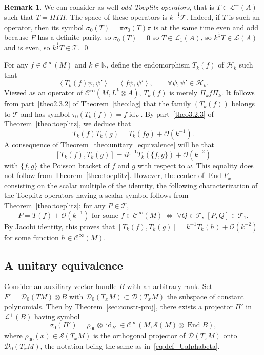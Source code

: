 \documentclass[10pt,a4paper]{article}
\theoremstyle{definition}
\newtheorem{rema}[theo]{Remark}
\numberwithin{equation}{section}
\newcommand{\N}{{\mathbb{N}}}
\newcommand{\si}{{\sigma}}
\newcommand{\om}{{\omega}}
\newcommand{\op}{\operatorname}
\newcommand{\Ci}{{\mathcal{C}}^{\infty}}
\newcommand{\bigo}{\mathcal{O}}
\newcommand{\D}{\mathcal{D}}
\newcommand{\symb}{\mathcal{S}}
\newcommand{\lag}{\mathcal{L}}
\newcommand{\Hilb}{\mathcal{H}}
\newcommand{\clT}{\mathcal{T}}
\newcommand{\Uu}{\rho}
\let\oldforall\forall
\renewcommand*{\forall}{\mathrel{\oldforall}}
\begin{document}
\begin{rema} \label{rem:odd_toeplitz}
We can consider as well {\em odd Toeplitz operators}, that is $T \in \lag^{-} (A)$ such that $T =
\Pi T \Pi$. The space of these operators is $k^{-\frac{1}{2}} \clT$. Indeed, if $T $ is such an operator, then its symbol $ \si_0 (T) = \pi \si_0 (T) \pi$ is at the same time even and odd because $F$ has a definite parity, so $\si_0(T) =0$ so $T
\in \lag_1 (A)$, so $k^{\frac{1}{2}} T \in \lag (A)$ and is even, so $k^{\frac{1}{2}} T \in \clT$. \qed
\end{rema}


For any $f \in \Ci(M)$ and $k \in \N$, define the endomorphism $T_k(f)$ of $\Hilb_k$ such that
\[
\left\langle T_k (f) \psi, \psi' \right\rangle = \left\langle f \psi, \psi'\right\rangle,
\qquad \forall \psi, \psi' \in \Hilb_k.
\]
Viewed as an operator of $\Ci (M, L^k \otimes A)$, $T_k(f)$ is merely $\Pi_k f \Pi_k$. It follows from part~\eqref{theo2.3.2} of Theorem~\ref{theo:lag} that the family $(T_k(f))$ belongs to $\clT$ and has symbol $\tau_0 (T_k (f))= f
\op{id}_{F}$. By part~\eqref{theo3.2.3} of Theorem~\ref{theo:toeplitz}, we deduce that
\[
T_k (f) T_k (g) = T_k (fg) + \bigo \left(k^{-1}\right).
\]
A consequence of Theorem~\ref{theo:unitary_equivalence} will be that
\[
\left[T_k (f), T_k (g)\right] = i k^{-1} T_k (\{ f,g \}) + \bigo \left(k^{-2}\right)
\]
with $\{ f, g \}$ the Poisson bracket of $f$ and $g$ with respect to $\om$. This equality does not follow from Theorem~\ref{theo:toeplitz}. However,  the center of $\op{End} F_x$ consisting on the scalar multiple of the identity,  the following characterization of the Toeplitz operators having a scalar symbol follows from Theorem~\ref{theo:toeplitz}: for any $P \in
\clT $,
\[
P = T (f) +\bigo (k^{-1}) \text{ for some } f \in \Ci (M) \, \Leftrightarrow \;
\forall Q \in \clT, \, [P,Q] \in \clT_{1}.
\]
By Jacobi identity, this proves that $[T_k (f), T_k (g)] = k^{-1} T_k (h) +
\bigo (k^{-2})$ for some function $h \in \Ci(M)$.

\subsection{A unitary equivalence}\label{sec:unitary-equivalence}

Consider an auxiliary vector bundle $B$ with an arbitrary rank. Set $F' = \D_0 (T M) \otimes B $ with $\D_0 (T_xM) \subset \D (T_xM)$ the subspace of constant polynomials. Then by Theorem~\ref{sec:constr-proj}, there exists a projector $\Pi'$ in $\lag^{+}(B)$ having symbol
\[
\si_0(\Pi') = \Uu_{00} \otimes \op{id}_{B} \in \Ci (M,\symb(M) \otimes \op{End}
B),
\]
where $\Uu_{00} (x) \in \symb (T_xM)$ is the orthogonal projector of
$\D (T_xM)$ onto $\D_0 (T_xM)$, the notation being the same as in~\eqref{eq:def_Ualphabeta}.
\end{document}
